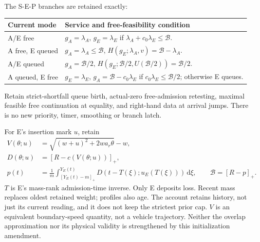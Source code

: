 \documentclass[11pt,a4paper]{article}
\newcommand{\pos}[1]{[#1]_+}
\newcommand{\dd}{\,\mathrm d}
\newcommand{\bud}{\mathcal B}
\begin{document}
The S-E-P branches are retained exactly:
\begin{center}\small
\begin{tabular}{p{28mm}p{118mm}}
\toprule
Current mode & Service and free-feasibility condition\\
\midrule
A/E free & $g_A=\lambda_A$, $g_E=\lambda_E$ if
$\lambda_A+c_0\lambda_E\leq\bud$.\\[4pt]
A free, E queued & $g_A=\lambda_A\leq\bud$,
$H(g_E;\lambda_A,v)=\bud-\lambda_A$.\\[4pt]
A/E queued & $g_A=\bud/2$,
$H(g_E;\bud/2,U(\bud/2))=\bud/2$.\\[4pt]
A queued, E free & $g_E=\lambda_E$, $g_A=\bud-c_0\lambda_E$
if $c_0\lambda_E\leq\bud/2$; otherwise E queues.\\
\bottomrule
\end{tabular}\end{center}
Retain strict-shortfall queue birth, actual-zero free-admission retesting,
maximal feasible free continuation at equality, and right-hand data at
arrival jumps. There is no new priority, timer, smoothing or branch latch.

For E's insertion mark $u$, retain
\begin{align}
 V(\theta;u)&=\sqrt{(w+u)^2+2wa_r\theta}-w,\nonumber\\
 D(\theta;u)&=\pos{R-c(V(\theta;u))},\nonumber\\
 p(t)&=\frac1m\int_{\pos{Y_E(t)-m}}^{Y_E(t)}
 D(t-T(\xi);u_E(T(\xi)))\dd\xi,\qquad \bud=\pos{R-p}.
 \label{eq:recovery}
\end{align}
$T$ is E's mass-rank admission-time inverse. Only E deposits loss. Recent
mass replaces oldest retained weight; profiles also age. The account
retains history, not just its current reading, and it does not keep the
strictest prior cap. $V$ is an equivalent boundary-speed quantity, not a
vehicle trajectory. Neither the overlap approximation nor its physical
validity is strengthened by this initialization amendment.
\end{document}
